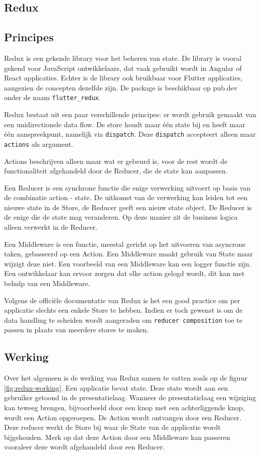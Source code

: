 \subsection{Redux}
\subsection*{Principes}
Redux is een gekende library voor het beheren van state. De library is vooral gekend voor JavaScript ontwikkelaars, dat vaak gebruikt wordt in Angular of React applicaties. Echter is de library ook bruikbaar voor Flutter applicaties, aangezien de concepten dezelfde zijn. De package is beschikbaar op pub.dev onder de naam \verb|flutter_redux|.

Redux bestaat uit een paar verschillende principes: er wordt gebruik gemaakt van een unidirectionele data flow. De store houdt maar één state bij en heeft maar één aanspreekpunt, namelijk via \verb|dispatch|. Deze \verb|dispatch| accepteert alleen maar \verb|actions| als argument.

Actions beschrijven alleen maar wat er gebeurd is, voor de rest wordt de functionaliteit afgehandeld door de Reducer, die de state kan aanpassen.

Een Reducer is een synchrone functie die enige verwerking uitvoert op basis van de combinatie action - state. De uitkomst van de verwerking kan leiden tot een nieuwe state in de Store, de Reducer geeft een nieuw state object. De Reducer is de enige die de state mag veranderen. Op deze manier zit de business logica alleen verwerkt in de Reducer. 

Een Middleware is een functie, meestal gericht op het uitvoeren van asyncrone taken, gebasseerd op een Action. Een Middleware maakt gebruik van State maar wijzigt deze niet. Een voorbeeld van een Middleware kan een logger functie zijn. Een ontwikkelaar kan ervoor zorgen dat elke action gelogd wordt, dit kan met behulp van een Middleware.

Volgens de officiële documentatie van Redux is het een good practice om per applicatie slechts een enkele Store te hebben. Indien er toch gewenst is om de data handling te scheiden wordt aangeraden om \verb|reducer composition| toe te passen in plaats van meerdere stores te maken.

\subsection{Werking}
Over het algemeen is de werking van Redux samen te vatten zoals op de figuur \ref{fig:redux-working}. Een applicatie bevat state. Deze state wordt aan een gebruiker getoond in de presentatielaag. Wanneer de presentatielaag een wijziging kan teweeg brengen, bijvoorbeeld door een knop met een achterliggende knop, wordt een Action opgeroepen. De Action wordt ontvangen door een Reducer. Deze reducer werkt de Store bij waar de State van de applicatie wordt bijgehouden. Merk op dat deze Action door een Middleware kan passeren vooraleer deze wordt afgehandeld door een Reducer.

